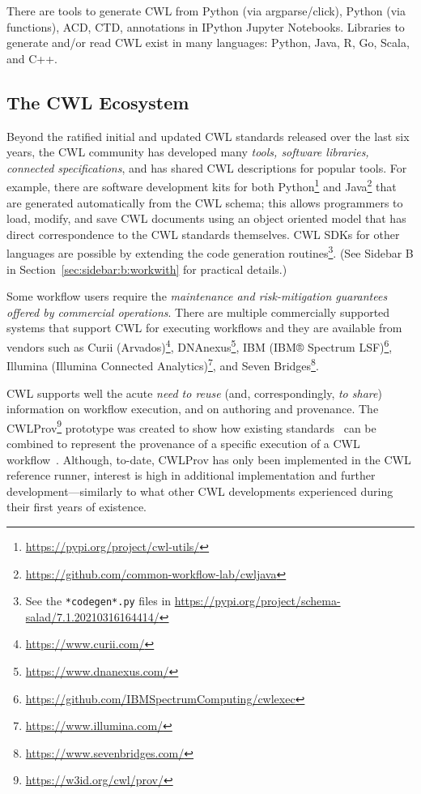 \documentclass[sigconf,revew,screen,timestamp,nonacm]{acmart}
\begin{document}
There are tools to generate CWL from Python (via argparse/click), Python (via functions), ACD, CTD, annotations in IPython Jupyter Notebooks. Libraries to generate and/or read CWL exist in many languages: Python, Java, R, Go, Scala, and C++.

\subsection{The CWL Ecosystem}\label{sec:open:ecosystem}

Beyond the ratified initial and updated CWL standards released over the last six years, the CWL community has developed many \textit{tools, software libraries, connected specifications}, and has shared CWL descriptions for popular tools. For example, there are software development kits for both Python\footnote{\url{https://pypi.org/project/cwl-utils/}} and Java\footnote{\url{https://github.com/common-workflow-lab/cwljava}} that are generated automatically from the CWL schema; this allows programmers to load, modify, and save CWL documents using an object oriented model that has direct correspondence to the CWL standards themselves. CWL SDKs for other languages are possible by extending the code generation routines\footnote{See the \texttt{*codegen*.py} files in \url{https://pypi.org/project/schema-salad/7.1.20210316164414/}}. (See Sidebar B in Section~\ref{sec:sidebar:b:workwith} for practical details.)

Some workflow users require the \textit{maintenance and risk-mitigation guarantees offered by commercial operations}. There are multiple commercially supported systems that support CWL for executing workflows and they are available from vendors such as Curii (Arvados)\footnote{\url{https://www.curii.com/}}, DNAnexus\footnote{\url{https://www.dnanexus.com/}}, IBM (IBM® Spectrum LSF)\footnote{\url{https://github.com/IBMSpectrumComputing/cwlexec}}, Illumina (Illumina Connected Analytics)\footnote{\url{https://www.illumina.com/}}, and Seven Bridges\footnote{\url{https://www.sevenbridges.com/}}.

CWL supports well the acute \textit{need to reuse} (and, correspondingly, \textit{to share}) information on workflow execution, and on authoring and provenance. The CWLProv\footnote{\url{https://w3id.org/cwl/prov/}} prototype was created to show how existing standards~\cite{belhajjame_using_2015,kunze_bagit_2018,missier_w3c_2013} can be combined to represent the provenance of a specific execution of a CWL workflow~\cite{khan_sharing_2019}. Although, to-date, CWLProv has only been implemented in the CWL reference runner, interest is high in additional implementation and further development---similarly to what other CWL developments experienced during their first years of existence.
\end{document}
